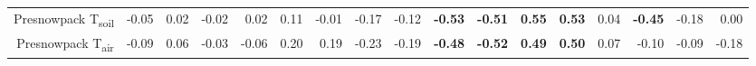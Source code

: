 \begin{table}[ht]
\begin{tabular}{rrrrrrrrrrrrrrrrr}
  Presnowpack T\textsubscript{soil}\tnote{c} & -0.05 & 0.02 & -0.02 & 0.02 & 0.11 & -0.01 & -0.17 & -0.12 & \textbf{ -0.53 } & \textbf{ -0.51 } & \textbf{ 0.55 } & \textbf{ 0.53 } & 0.04 & \textbf{ -0.45 } & -0.18 & 0.00 \\ 
  Presnowpack T\textsubscript{air} & -0.09 & 0.06 & -0.03 & -0.06 & 0.20 & 0.19 & -0.23 & -0.19 & \textbf{ -0.48 } & \textbf{ -0.52 } & \textbf{ 0.49 } & \textbf{ 0.50 } & 0.07 & -0.10 & -0.09 & -0.18 \\ 
   \hline
\end{tabular}
\end{table}
